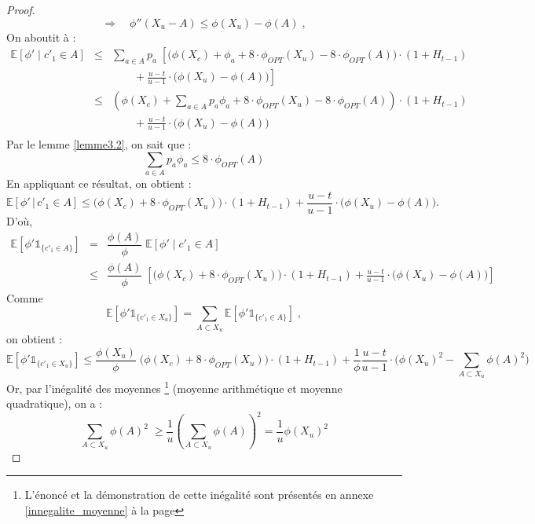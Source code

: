 \documentclass[12pt,a4paper]{book}
\newcommand{\E}{\mathbb{E}}
\newcommand{\1}{\mathds{1}}
\begin{document}
\begin{proof}
		  $$
		  	\Rightarrow \quad \phi'' \left( X_u - A \right) \leq \phi \left( X_u \right) - \phi \left( A \right) \; ,
		  $$
		  On aboutit à : 
		  \begin{eqnarray*}
		  	\E\left[\phi' \; | \; c'_1 \in A \right] &\leq & \sum_{a \in A} p_a \; \left[ \bigg( \phi \left( X_c \right) + \phi_a + 8 \cdot \phi_{OPT} \left( X_u \right) - 8 \cdot \phi_{OPT} \left( A \right) \bigg) \cdot \left( 1 + H_{t-1} \right)\right. \\
		  	&& \qquad + \left. \frac{u-t}{u-1} \cdot \bigg( \phi \left( X_u \right) - \phi \left( A \right) \bigg) \right]\\
		  	& \leq & \left( \phi \left( X_c \right) +\sum_{a \in A} p_a \phi_a + 8 \cdot \phi_{OPT} \left( X_u \right) - 8 \cdot \phi_{OPT} \left( A \right) \right) \cdot \left( 1 + H_{t-1} \right)\\
		  	&& \qquad + \frac{u-t}{u-1} \cdot \bigg( \phi \left( X_u \right) - \phi \left( A \right) \bigg) \\
		  \end{eqnarray*}
		  Par le lemme \ref{lemme3.2}, on sait que :
		  $$
		  	\sum_{a \in A} p_a \phi_a \leq 8 \cdot \phi_{OPT} \left( A \right)
		  $$
		  En appliquant ce résultat, on obtient : 
		  $$
		  	\E\left[\phi' \, | \, c'_1 \in A \right] \leq \bigg( \phi \left( X_c \right) + 8 \cdot \phi_{OPT} \left( X_u \right) \bigg) \cdot \left( 1 + H_{t-1} \right) + \frac{u-t}{u-1} \cdot \bigg( \phi \left( X_u \right) - \phi \left( A \right) \bigg).
		  $$
		  D'où,
		  \begin{eqnarray*}
		   \E\left[\phi' \1_{\{c'_1 \in A\}} \right] &=& \dfrac{\phi \left( A \right)}{\phi} \; \E\left[\phi' \; | \; c'_1 \in A \right] \\
		   & \leq & \dfrac{\phi \left( A \right)}{\phi} \; \left[ \bigg( \phi \left( X_c \right) + 8 \cdot \phi_{OPT} \left( X_u \right) \bigg) \cdot \left( 1 + H_{t-1} \right) + \frac{u-t}{u-1} \cdot \bigg( \phi \left( X_u \right) - \phi \left( A \right) \bigg) \right]
		  \end{eqnarray*}
		  Comme
		  $$
		  	\E\left[\phi' \1_{\{c'_1 \in X_u\}} \right] = \sum_{A \subset X_u} \E\left[\phi' \1_{\{c'_1 \in A\}} \right] \; ,
		  $$
		  on obtient : 
		  $$
		  	\E\left[\phi' \1_{\{c'_1 \in X_u\}} \right] \leq \dfrac{\phi \left( X_u \right)}{\phi} \; \bigg( \phi \left( X_c \right) + 8 \cdot \phi_{OPT} \left( X_u \right) \bigg) \cdot \left( 1 + H_{t-1} \right) + \frac{1}{\phi} \frac{u-t}{u-1} \cdot \bigg( \phi \left( X_u \right)^2 - \sum_{A \subset X_u} \phi \left( A \right)^2 \bigg)
		  $$
		  Or, par l'inégalité des moyennes \footnote{L'énoncé et la démonstration de cette inégalité sont présentés en annexe \ref{innegalite_moyenne} à la page \pageref{innegalite_moyenne}}  (moyenne arithmétique et moyenne quadratique), on a : 
		  $$
		  	\sum_{A \subset X_u} \phi \left( A \right)^2 \; \geq \frac{1}{u} \left( \sum_{A \subset X_u} \phi \left( A \right) \right)^2 = \frac{1}{u} \phi \left( X_u \right)^2
		  $$
		  

\end{proof}
\end{document}
